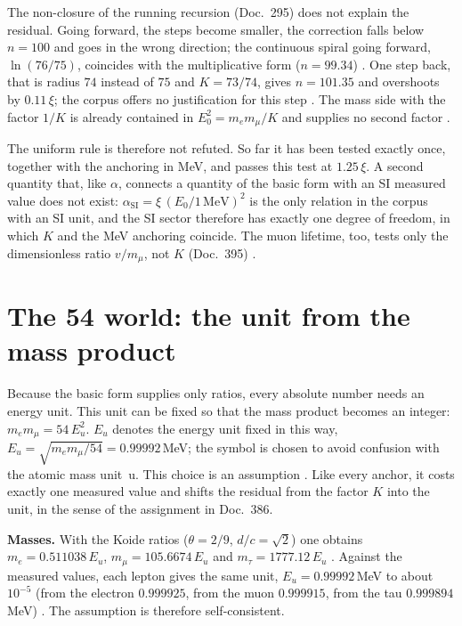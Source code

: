The non-closure of the running recursion (Doc.~295) does not explain the residual. Going forward,
the steps become smaller, the correction falls below $n=100$ and goes in the wrong direction; the
continuous spiral going forward, $\ln(76/75)$, coincides with the multiplicative form ($n=99.34$)
\KM. One step back, that is radius $74$ instead of $75$ and $K=73/74$, gives $n=101.35$ and
overshoots by $0.11\,\xi$; the corpus offers no justification for this step \SM. The mass side with
the factor $1/K$ is already contained in $E_0^2=m_em_\mu/K$ and supplies no second factor \BM.

The uniform rule is therefore not refuted. So far it has been tested exactly once, together with the
anchoring in MeV, and passes this test at $1.25\,\xi$. A second quantity that, like $\alpha$, connects a quantity of the basic
form with an SI measured value does not exist: $\alpha_{\text{SI}}=\xi\,(E_0/1\,\text{MeV})^2$ is the only
relation in the corpus with an SI unit, and the SI sector therefore has exactly one degree of freedom,
in which $K$ and the MeV anchoring coincide. The muon lifetime, too, tests only the dimensionless ratio
$v/m_\mu$, not $K$ (Doc.~395) \BM.

\section{The 54 world: the unit from the mass product}

Because the basic form supplies only ratios, every absolute number needs an energy unit. This unit
can be fixed so that the mass product becomes an integer: $m_em_\mu=54\,E_u^2$. $E_u$ denotes the energy unit fixed in this way, $E_u=\sqrt{m_em_\mu/54}=0.99992$\,MeV; the symbol
is chosen to avoid confusion with the atomic mass unit~u. This choice is an
assumption \SM. Like every anchor, it costs exactly one measured value and shifts the residual from the factor
$K$ into the unit, in the sense of the assignment in Doc.~386.

\textbf{Masses.} With the Koide ratios ($\theta=2/9$, $d/c=\sqrt2$) one obtains
$m_e=0.511038\,E_u$, $m_\mu=105.6674\,E_u$ and $m_\tau=1777.12\,E_u$ \KM. Against the measured values,
each lepton gives the same unit, $E_u=0.99992$\,MeV to about $10^{-5}$ (from the electron $0.999925$,
from the muon $0.999915$, from the tau $0.999894$\,MeV) \KM. The assumption is therefore
self-consistent.

